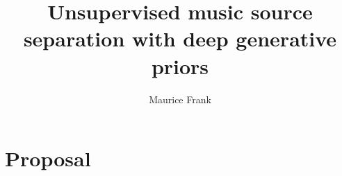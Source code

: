 \documentclass[nofonts, nobib]{tufte-book}
\title{Unsupervised music source separation with deep generative priors}
\author{Maurice Frank}
\begin{document}
\frontmatter%
\maketitle%

\tableofcontents
\clearpage

\mainmatter%
\chapter{Proposal}






\backmatter%

\printbibliography%
\end{document}
